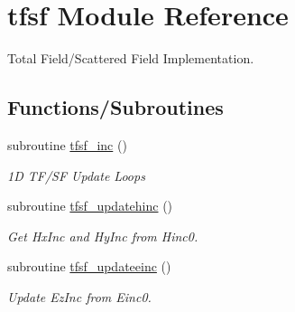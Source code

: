 \hypertarget{namespacetfsf}{}\section{tfsf Module Reference}
\label{namespacetfsf}


Total Field/\+Scattered Field Implementation.  


\subsection*{Functions/\+Subroutines}
\begin{DoxyCompactItemize}
\item 
subroutine \hyperlink{namespacetfsf_aa2ef130db3d1a7206055623c28c5a2e3}{tfsf\+\_\+inc} ()
\begin{DoxyCompactList}\small\item\em 1\+D T\+F/\+S\+F Update Loops \end{DoxyCompactList}\item 
subroutine \hyperlink{namespacetfsf_a96006e1e78b93b364ccfafa419921489}{tfsf\+\_\+updatehinc} ()
\begin{DoxyCompactList}\small\item\em Get Hx\+Inc and Hy\+Inc from Hinc0. \end{DoxyCompactList}\item 
subroutine \hyperlink{namespacetfsf_a03610cc04c70776bc1f6292523af664c}{tfsf\+\_\+updateeinc} ()
\begin{DoxyCompactList}\small\item\em Update Ez\+Inc from Einc0. \end{DoxyCompactList}\end{DoxyCompactItemize}
